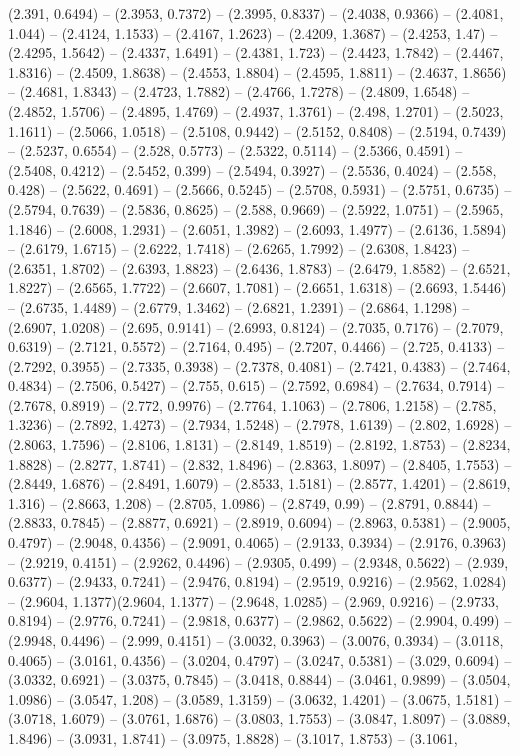 (2.391, 0.6494) -- (2.3953, 0.7372) -- (2.3995, 0.8337) -- (2.4038, 0.9366) -- (2.4081, 1.044) -- (2.4124, 1.1533) -- (2.4167, 1.2623) -- (2.4209, 1.3687) -- (2.4253, 1.47) -- (2.4295, 1.5642) -- (2.4337, 1.6491) -- (2.4381, 1.723) -- (2.4423, 1.7842) -- (2.4467, 1.8316) -- (2.4509, 1.8638) -- (2.4553, 1.8804) -- (2.4595, 1.8811) -- (2.4637, 1.8656) -- (2.4681, 1.8343) -- (2.4723, 1.7882) -- (2.4766, 1.7278) -- (2.4809, 1.6548) -- (2.4852, 1.5706) -- (2.4895, 1.4769) -- (2.4937, 1.3761) -- (2.498, 1.2701) -- (2.5023, 1.1611) -- (2.5066, 1.0518) -- (2.5108, 0.9442) -- (2.5152, 0.8408) -- (2.5194, 0.7439) -- (2.5237, 0.6554) -- (2.528, 0.5773) -- (2.5322, 0.5114) -- (2.5366, 0.4591) -- (2.5408, 0.4212) -- (2.5452, 0.399) -- (2.5494, 0.3927) -- (2.5536, 0.4024) -- (2.558, 0.428) -- (2.5622, 0.4691) -- (2.5666, 0.5245) -- (2.5708, 0.5931) -- (2.5751, 0.6735) -- (2.5794, 0.7639) -- (2.5836, 0.8625) -- (2.588, 0.9669) -- (2.5922, 1.0751) -- (2.5965, 1.1846) -- (2.6008, 1.2931) -- (2.6051, 1.3982) -- (2.6093, 1.4977) -- (2.6136, 1.5894) -- (2.6179, 1.6715) -- (2.6222, 1.7418) -- (2.6265, 1.7992) -- (2.6308, 1.8423) -- (2.6351, 1.8702) -- (2.6393, 1.8823) -- (2.6436, 1.8783) -- (2.6479, 1.8582) -- (2.6521, 1.8227) -- (2.6565, 1.7722) -- (2.6607, 1.7081) -- (2.6651, 1.6318) -- (2.6693, 1.5446) -- (2.6735, 1.4489) -- (2.6779, 1.3462) -- (2.6821, 1.2391) -- (2.6864, 1.1298) -- (2.6907, 1.0208) -- (2.695, 0.9141) -- (2.6993, 0.8124) -- (2.7035, 0.7176) -- (2.7079, 0.6319) -- (2.7121, 0.5572) -- (2.7164, 0.495) -- (2.7207, 0.4466) -- (2.725, 0.4133) -- (2.7292, 0.3955) -- (2.7335, 0.3938) -- (2.7378, 0.4081) -- (2.7421, 0.4383) -- (2.7464, 0.4834) -- (2.7506, 0.5427) -- (2.755, 0.615) -- (2.7592, 0.6984) -- (2.7634, 0.7914) -- (2.7678, 0.8919) -- (2.772, 0.9976) -- (2.7764, 1.1063) -- (2.7806, 1.2158) -- (2.785, 1.3236) -- (2.7892, 1.4273) -- (2.7934, 1.5248) -- (2.7978, 1.6139) -- (2.802, 1.6928) -- (2.8063, 1.7596) -- (2.8106, 1.8131) -- (2.8149, 1.8519) -- (2.8192, 1.8753) -- (2.8234, 1.8828) -- (2.8277, 1.8741) -- (2.832, 1.8496) -- (2.8363, 1.8097) -- (2.8405, 1.7553) -- (2.8449, 1.6876) -- (2.8491, 1.6079) -- (2.8533, 1.5181) -- (2.8577, 1.4201) -- (2.8619, 1.316) -- (2.8663, 1.208) -- (2.8705, 1.0986) -- (2.8749, 0.99) -- (2.8791, 0.8844) -- (2.8833, 0.7845) -- (2.8877, 0.6921) -- (2.8919, 0.6094) -- (2.8963, 0.5381) -- (2.9005, 0.4797) -- (2.9048, 0.4356) -- (2.9091, 0.4065) -- (2.9133, 0.3934) -- (2.9176, 0.3963) -- (2.9219, 0.4151) -- (2.9262, 0.4496) -- (2.9305, 0.499) -- (2.9348, 0.5622) -- (2.939, 0.6377) -- (2.9433, 0.7241) -- (2.9476, 0.8194) -- (2.9519, 0.9216) -- (2.9562, 1.0284) -- (2.9604, 1.1377)(2.9604, 1.1377) -- (2.9648, 1.0285) -- (2.969, 0.9216) -- (2.9733, 0.8194) -- (2.9776, 0.7241) -- (2.9818, 0.6377) -- (2.9862, 0.5622) -- (2.9904, 0.499) -- (2.9948, 0.4496) -- (2.999, 0.4151) -- (3.0032, 0.3963) -- (3.0076, 0.3934) -- (3.0118, 0.4065) -- (3.0161, 0.4356) -- (3.0204, 0.4797) -- (3.0247, 0.5381) -- (3.029, 0.6094) -- (3.0332, 0.6921) -- (3.0375, 0.7845) -- (3.0418, 0.8844) -- (3.0461, 0.9899) -- (3.0504, 1.0986) -- (3.0547, 1.208) -- (3.0589, 1.3159) -- (3.0632, 1.4201) -- (3.0675, 1.5181) -- (3.0718, 1.6079) -- (3.0761, 1.6876) -- (3.0803, 1.7553) -- (3.0847, 1.8097) -- (3.0889, 1.8496) -- (3.0931, 1.8741) -- (3.0975, 1.8828) -- (3.1017, 1.8753) -- (3.1061, 